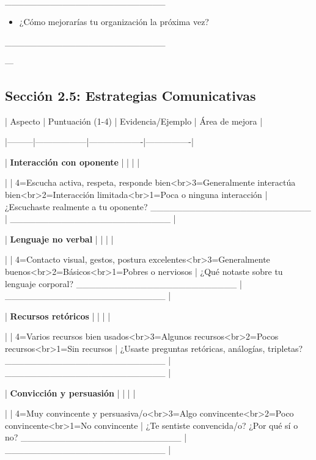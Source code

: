 \documentclass[a4paper,11pt]{article}
\begin{document}
_________________________

\begin{itemize}

  \item ¿Cómo mejorarías tu organización la próxima vez?

\end{itemize}

_________________________

\vspace{0.2cm}

---

\vspace{0.2cm}

\subsection{Sección 2.5: Estrategias Comunicativas}

\vspace{0.2cm}

| Aspecto | Puntuación (1-4) | Evidencia/Ejemplo | Área de mejora |

|---------|------------------|-------------------|----------------|

| \textbf{Interacción con oponente} | | | |

| | 4=Escucha activa, respeta, responde bien<br>3=Generalmente interactúa bien<br>2=Interacción limitada<br>1=Poca o ninguna interacción | ¿Escuchaste realmente a tu oponente? _________________________ | _________________________ |

| \textbf{Lenguaje no verbal} | | | |

| | 4=Contacto visual, gestos, postura excelentes<br>3=Generalmente buenos<br>2=Básicos<br>1=Pobres o nerviosos | ¿Qué notaste sobre tu lenguaje corporal? _________________________ | _________________________ |

| \textbf{Recursos retóricos} | | | |

| | 4=Varios recursos bien usados<br>3=Algunos recursos<br>2=Pocos recursos<br>1=Sin recursos | ¿Usaste preguntas retóricas, análogías, tripletas? _________________________ | _________________________ |

| \textbf{Convicción y persuasión} | | | |

| | 4=Muy convincente y persuasiva/o<br>3=Algo convincente<br>2=Poco convincente<br>1=No convincente | ¿Te sentiste convencida/o? ¿Por qué sí o no? _________________________ | _________________________ |
\end{document}
